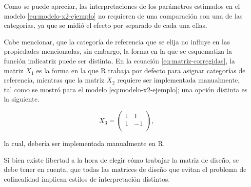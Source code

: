 \documentclass[
  11pt,
]{book}
\theoremstyle{definition}
\theoremstyle{definition}
\theoremstyle{definition}
\theoremstyle{definition}
\theoremstyle{remark}
\begin{document}
\begin{table}[H]
\centering
\caption{\label{tab:tablaxx}Ejemplificación de la relación de parámetros y esquema de función indicatriz}
\centering
{}
\end{table}

Como se puede apreciar, las interpretaciones de los parámetros estimados en el modelo \eqref{eq:modelo-x2-ejemplo} no requieren de una comparación con una de las categorías, ya que se midió el efecto por separado de cada una ellas.

Cabe mencionar, que la categoría de referencia que se elija no influye en las propiedades mencionadas, sin embargo, la forma en la que se esquematiza la función indicatriz puede ser distinta. En la ecuación \eqref{eq:matriz-corregidas}, la matriz \(X_1\) es la forma en la que R trabaja por defecto para asignar categorías de referencia, mientras que la matriz \(X_2\) requiere ser implementada manualmente, tal como se mostró para el modelo \eqref{eq:modelo-x2-ejemplo}; una opción distinta es la siguiente.

\begin{equation}
X_3 = \begin{pmatrix}
1 & 1 \\
1 & -1 \\
\end{pmatrix},
\label{eq:matriz-corregida3}
\end{equation}

la cual, debería ser implementada manualmente en R.

Si bien existe libertad a la hora de elegir cómo trabajar la matriz de diseño, se debe tener en cuenta, que todas las matrices de diseño que evitan el problema de colinealidad implican estilos de interpretación distintos.

\backmatter

  
\end{document}
